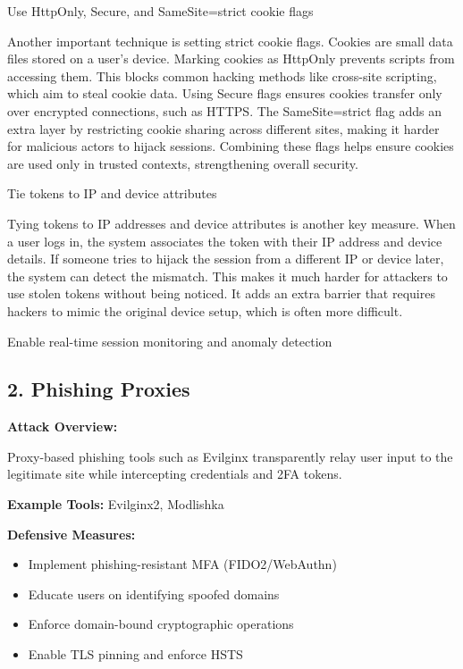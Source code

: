 Use HttpOnly, Secure, and SameSite=strict cookie flags

Another important technique is setting strict cookie flags. Cookies are small data files stored on a user’s device. Marking cookies as HttpOnly prevents scripts from accessing them. This blocks common hacking methods like cross-site scripting, which aim to steal cookie data. Using Secure flags ensures cookies transfer only over encrypted connections, such as HTTPS. The SameSite=strict flag adds an extra layer by restricting cookie sharing across different sites, making it harder for malicious actors to hijack sessions. Combining these flags helps ensure cookies are used only in trusted contexts, strengthening overall security.

Tie tokens to IP and device attributes

Tying tokens to IP addresses and device attributes is another key measure. When a user logs in, the system associates the token with their IP address and device details. If someone tries to hijack the session from a different IP or device later, the system can detect the mismatch. This makes it much harder for attackers to use stolen tokens without being noticed. It adds an extra barrier that requires hackers to mimic the original device setup, which is often more difficult.

Enable real-time session monitoring and anomaly detection

\subsection{\textbf{2. Phishing Proxies}}

\textbf{Attack Overview:}

Proxy-based phishing tools such as Evilginx transparently relay user input to the legitimate site while intercepting credentials and 2FA tokens.

\textbf{Example Tools:} Evilginx2, Modlishka

\textbf{Defensive Measures:}

\begin{itemize}
    \item Implement phishing-resistant MFA (FIDO2/WebAuthn)
    \item Educate users on identifying spoofed domains
    \item Enforce domain-bound cryptographic operations
    \item Enable TLS pinning and enforce HSTS

\end{itemize}


